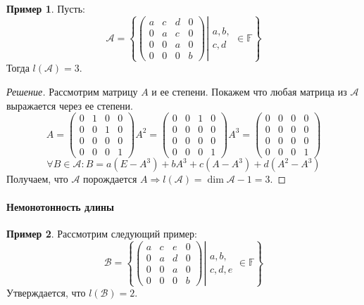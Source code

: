 \documentclass[a4paper, 14pt]{extarticle}
\theoremstyle{definition}
\newtheorem{example}{Пример}
\begin{document}
\begin{example}
	Пусть:
	\[\mathcal{A} = \left\{ \left. \left( 
	\begin{array}{cccc}
		a&c&d&0\\
		0&a&c&0\\
		0&0&a&0\\
		0&0&0&b
	\end{array} \right) \right| \substack{a, b,\\ c, d} \in \mathbb{F} \right\}\]
	Тогда \(l(\mathcal{A}) = 3\).
\end{example}

\begin{proof}[Решение]
	Рассмотрим матрицу \(A\) и ее степени. Покажем что любая матрица из \(\mathcal{A}\) выражается через ее степени.
	\[A = \left( \begin{array}{cccc}
		0&1&0&0\\
		0&0&1&0\\
		0&0&0&0\\
		0&0&0&1
	\end{array} \right)
	A^2 = \left( \begin{array}{cccc}
		0&0&1&0\\
		0&0&0&0\\
		0&0&0&0\\
		0&0&0&1
	\end{array} \right)
	A^3 = \left( \begin{array}{cccc}
		0&0&0&0\\
		0&0&0&0\\
		0&0&0&0\\
		0&0&0&1
	\end{array} \right)\]
	\[\forall B \in \mathcal{A}: B = a(E - A^3) + bA^3 + c(A - A^3) + d(A^2 - A^3)\]
	Получаем, что \(\mathcal{A}\) порождается \(A \Rightarrow l(\mathcal{A}) = \operatorname{dim} \mathcal{A} - 1 = 3\).
\end{proof}

\paragraph{Немонотонность длины}

\begin{example}
	Рассмотрим следующий пример:
	\[\mathcal{B} = \left\{ \left. \left( 
	\begin{array}{cccc}
		a&c&e&0\\
		0&a&d&0\\
		0&0&a&0\\
		0&0&0&b
	\end{array} \right) \right| \substack{a, b,\\ c, d, e} \in \mathbb{F} \right\}\]
	Утверждается, что \(l(\mathcal{B}) = 2.\)
\end{example}
\end{document}
